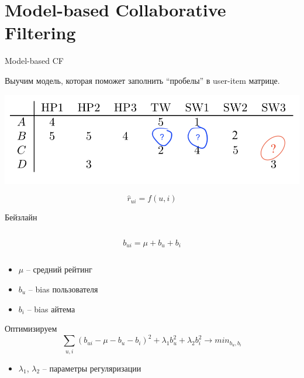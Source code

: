 \documentclass[11pt,aspectratio=169,handout]{beamer}
\begin{document}
\section{Model-based Collaborative Filtering}

\begin{frame}{Model-based CF}

\begin{tcolorbox}[colback=info!5,colframe=info!80,title=Идея]
Выучим модель, которая поможет заполнить ``пробелы'' в user-item матрице.
\end{tcolorbox}

\begin{center}
\includegraphics[scale=0.5]{images/utility-2.png}
\end{center}

\[
\hat r_{ui} = f(u, i)
\]

\end{frame}

\begin{frame}{Бейзлайн \cite{KOREN}}

\begin{columns}
\begin{column}{0.2\textwidth} 
\end{column}
\begin{column}{0.5\textwidth} 
\begin{tcolorbox}[colback=info!5,colframe=info!80,title=Модель]
\[
b_{ui} = \mu + b_u + b_i
\]
\end{tcolorbox}
\end{column}
\begin{column}{0.2\textwidth} 
\end{column}
\end{columns}

\vfill

\begin{itemize}
\item $\mu$ -- средний рейтинг
\item $b_u$ -- bias пользователя
\item $b_i$ -- bias айтема
\end{itemize}

\vfill

Оптимизируем
\[
\sum_{u, i} (b_{ui} - \mu - b_u - b_i)^2 + \lambda_1 b_u^2 + \lambda_2 b_i^2 \rightarrow min_{b_u, b_i}
\]
\begin{itemize}
\item $\lambda_1$, $\lambda_2$ -- параметры регуляризации
\end{itemize}

\end{frame}
\end{document}
